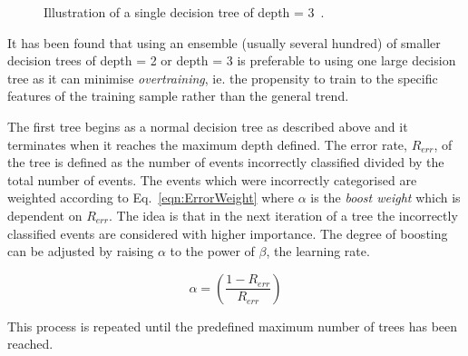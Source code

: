 \begin{figure}[h!]
\begin{center}
\hspace{0.2cm}
\end{center}
\caption{Illustration of a single decision tree of depth = 3~\cite{2007physics3039H}.}
\label{fig:DecisionTree}
\end{figure} 

It has been found that using an ensemble (usually several hundred) of smaller decision trees of depth = 2 or depth = 3 is preferable to using one large decision tree as it can minimise \emph{overtraining}, ie. the propensity to train to the specific features of the training sample rather than the general trend. 

The first tree begins as a normal decision tree as described above and it terminates when it reaches the maximum depth defined. The error rate, $R_{err}$, of the tree is defined as the number of events incorrectly classified divided by the total number of events. The events which were incorrectly categorised are weighted according to Eq.~\ref{eqn:ErrorWeight} where $\alpha$ is the \emph{boost weight} which is dependent on $R_{err}$. The idea is that in the next iteration of a tree the incorrectly classified events are considered with higher importance. The degree of boosting can be adjusted by raising $\alpha$ to the power of $\beta$, the learning rate.

\begin{equation}
\alpha = \left( \frac{1-R_{err}}{R_{err}}  \right)
\label{eqn:ErrorWeight}
\end{equation}

This process is repeated until the predefined maximum number of trees has been reached. 


